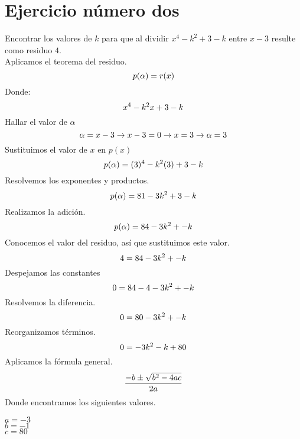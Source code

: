\documentclass[letterpaper, 10pt]{article}
\begin{document}
    \section{Ejercicio número dos}
        Encontrar los valores de $k$ para que al dividir $x^4-k^2+3-k$ entre $x-3$ resulte como residuo $4$. \\
        Aplicamos el teorema del residuo.
        \begin{equation} \notag p(\alpha)=r(x) \end{equation}
        Donde:
        \begin{equation} \notag x^4-k^2x+3-k \end{equation}
        Hallar el valor de $\alpha$
        \begin{equation} \notag \alpha=x-3 \rightarrow x-3=0 \rightarrow x=3 \rightarrow \alpha=3 \end{equation}
        Sustituimos el valor de $x$ en $p(x)$
        \begin{equation} \notag p(\alpha)=(3)^4-k^2(3)+3-k \end{equation}
        Resolvemos los exponentes y productos.
        \begin{equation} \notag p(\alpha)=81-3k^2+3-k \end{equation}
        Realizamos la adición.
        \begin{equation} \notag p(\alpha)=84-3k^2+-k \end{equation}
        Conocemos el valor del residuo, así que sustituimos este valor.
        \begin{equation} \notag 4=84-3k^2+-k \end{equation}
        Despejamos las constantes
        \begin{equation} \notag 0=84-4-3k^2+-k \end{equation}
        Resolvemos la diferencia.
        \begin{equation} \notag 0=80-3k^2+-k \end{equation}
        Reorganizamos términos.
        \begin{equation} \notag 0=-3k^2-k+80 \end{equation}
        Aplicamos la fórmula general.
        \begin{equation} \notag \frac{-b\pm \sqrt{b^2-4ac}}{2a} \end{equation}    
        Donde encontramos los siguientes valores.
        \begin{center} $a=-3$\\ $b=-1$ \\ $c=80$ \end{center}
\end{document}
